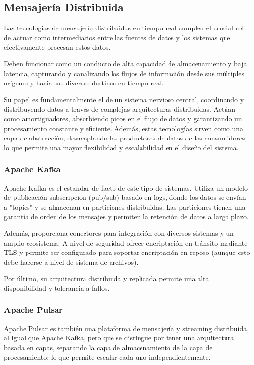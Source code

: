 \subsection{Mensajería Distribuida}

Las tecnologias de mensajería distribuidas en tiempo real cumplen el crucial rol de actuar como intermediarios entre las fuentes de datos 
y los sistemas que efectivamente procesan estos datos. \parencite{kleppmann} 

Deben funcionar como un conducto de alta capacidad de almacenamiento y baja latencia, capturando y canalizando los flujos de información
desde sus múltiples orígenes y hacia sus diversos destinos en tiempo real. \parencite{bigdata}

Su papel es fundamentalmente el de un sistema nervioso central, coordinando y distribuyendo datos a través de complejas arquitecturas distribuidas. 
Actúan como amortiguadores, absorbiendo picos en el flujo de datos y garantizando un procesamiento constante y eficiente. 
Además, estas tecnologías sirven como una capa de abstracción, desacoplando los productores de datos de los consumidores, 
lo que permite una mayor flexibilidad y escalabilidad en el diseño del sistema.

\subsubsection{Apache Kafka}
Apache Kafka es el estandar de facto de este tipo de sistemas. Utiliza un modelo de publicación-subscripcion (pub/sub) basado en logs, 
donde los datos se envían a "topics" y se almacenan en particiones distribuidas. Las particiones tienen una garantía de orden de los mensajes
y permiten la retención de datos a largo plazo.

Además, proporciona conectores para integración con diversos sistemas y un amplio ecosistema. A nivel de seguridad ofrece encriptación
en tránsito mediante TLS y permite ser configurado para soportar encriptación en reposo (aunque esto debe hacerse a nivel de sistema de archivos).

Por último, su arquitectura distribuida y replicada permite una alta disponibilidad y tolerancia a fallos.
\subsubsection{Apache Pulsar}
Apache Pulsar es también una plataforma de mensajería y streaming distribuida, al igual que Apache Kafka, pero que se distingue por tener una 
arquitectura basada en capas, separando la capa de almacenamiento de la capa de procesamiento; lo que permite escalar cada uno independientemente.


